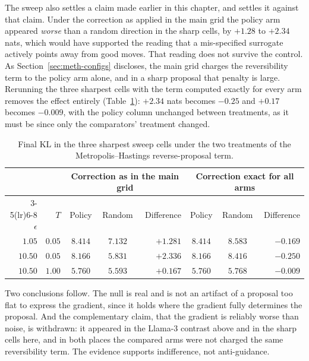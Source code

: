 The sweep also settles a claim made earlier in this chapter, and settles it against that claim. Under the correction as applied in the main grid the policy arm appeared \emph{worse} than a random direction in the sharp cells, by $+1.28$ to $+2.34$ nats, which would have supported the reading that a mis-specified surrogate actively points away from good moves. That reading does not survive the control. As Section~\ref{sec:meth-configs} discloses, the main grid charges the reversibility term to the policy arm alone, and in a sharp proposal that penalty is large. Rerunning the three sharpest cells with the term computed exactly for every arm removes the effect entirely (Table~\ref{tab:mhfix}): $+2.34$ nats becomes $-0.25$ and $+0.17$ becomes $-0.009$, with the policy column unchanged between treatments, as it must be since only the comparators' treatment changed.

\begin{table}[htbp]
    \centering
    \small
    \begin{tabular}{rrccrccr}
        \toprule
        & & \multicolumn{3}{c}{Correction as in the main grid} & \multicolumn{3}{c}{Correction exact for all arms} \\
        \cmidrule(lr){3-5}\cmidrule(lr){6-8}
        $\epsilon$ & $T$ & Policy & Random & Difference & Policy & Random & Difference \\
        \midrule
        $1.05$  & $0.05$ & $8.414$ & $7.132$ & $+1.281$ & $8.414$ & $8.583$ & $-0.169$ \\
        $10.50$ & $0.05$ & $8.166$ & $5.831$ & $+2.336$ & $8.166$ & $8.416$ & $-0.250$ \\
        $10.50$ & $1.00$ & $5.760$ & $5.593$ & $+0.167$ & $5.760$ & $5.768$ & $-0.009$ \\
        \bottomrule
    \end{tabular}
    \caption[Final KL under two treatments of the reverse-proposal term.]{Final KL in the three sharpest sweep cells under the two treatments of the Metropolis--Hastings reverse-proposal term.}
    \label{tab:mhfix}
\end{table}

Two conclusions follow. The null is real and is not an artifact of a proposal too flat to express the gradient, since it holds where the gradient fully determines the proposal. And the complementary claim, that the gradient is reliably worse than noise, is withdrawn: it appeared in the Llama-3 contrast above and in the sharp cells here, and in both places the compared arms were not charged the same reversibility term. The evidence supports indifference, not anti-guidance.

